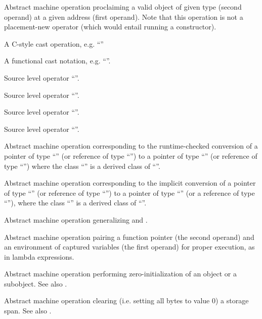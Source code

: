 Abstract machine operation proclaiming a valid object of given type (second operand) at a given address (first operand).  
Note that this operation is not a placement-new operator (which would entail running a constructor).

A C-style cast operation, e.g. ``''

A functional cast notation, e.g. ``''.

Source level operator ``''.

Source level operator ``''.

Source level operator ``''.

Source level operator ``''.

Abstract machine operation corresponding to the runtime-checked conversion of a pointer of type ``'' 
(or reference of type ``'') to a pointer of type ``'' (or reference of type ``'')
where the class ``'' is a derived class of ``''.

Abstract machine operation corresponding to the implicit conversion of a pointer of type ``'' (or 
reference of type ``'') to a pointer of type ``'' (or a reference of type ``''),
where the class ``'' is a derived class of ``''.

Abstract machine operation generalizing  and .

Abstract machine operation pairing a function pointer (the second operand) and an environment of captured variables (the first operand) 
for proper execution, as in lambda expressions.

Abstract machine operation performing zero-initialization of an object or a subobject.
See also .

Abstract machine operation clearing (i.e. setting all bytes to value $0$) a storage span.
See also .

